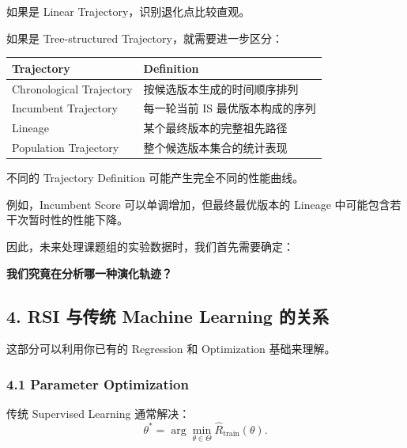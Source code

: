 
如果是 Linear Trajectory，识别退化点比较直观。

如果是 Tree-structured Trajectory，就需要进一步区分：

\begin{readertable}
\begin{longtable}[]{@{}
  >{\raggedright\arraybackslash}p{}
  >{\raggedright\arraybackslash}p{}@{}}
\toprule
Trajectory & Definition \\
\midrule
\endhead
Chronological Trajectory & 按候选版本生成的时间顺序排列 \\
Incumbent Trajectory & 每一轮当前 IS 最优版本构成的序列 \\
Lineage & 某个最终版本的完整祖先路径 \\
Population Trajectory & 整个候选版本集合的统计表现 \\
\bottomrule
\end{longtable}
\end{readertable}

不同的 Trajectory Definition 可能产生完全不同的性能曲线。

例如，Incumbent Score 可以单调增加，但最终最优版本的 Lineage 中可能包含若干次暂时性的性能下降。

因此，未来处理课题组的实验数据时，我们首先需要确定：

\textbf{我们究竟在分析哪一种演化轨迹？}

\hypertarget{part-1-07-0001-rsi-ux4e0eux4f20ux7edf-machine-learning-ux7684ux5173ux7cfb}{%
\subsection{4. RSI 与传统 Machine Learning 的关系}\label{part-1-07-0001-rsi-ux4e0eux4f20ux7edf-machine-learning-ux7684ux5173ux7cfb}}

这部分可以利用你已有的 Regression 和 Optimization 基础来理解。

\hypertarget{part-1-07-0001-parameter-optimization}{%
\subsubsection{4.1 Parameter Optimization}\label{part-1-07-0001-parameter-optimization}}

传统 Supervised Learning 通常解决：
\[\theta^*
=
\arg\min_{\theta\in\Theta}
\widehat R_{\mathrm{train}}(\theta).\]

